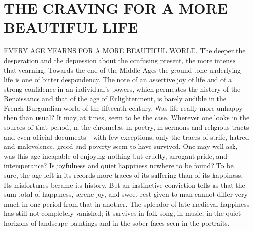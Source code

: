 \chapter{THE CRAVING FOR A MORE BEAUTIFUL LIFE}

EVERY AGE YEARNS FOR A MORE BEAUTIFUL WORLD. The deeper the desperation
and the depression about the confusing present, the more intense that
yearning. Towards the end of the Middle Ages the ground tone underlying
life is one of bitter despondency. The note of an assertive joy of life
and of a strong confidence in an individual's powers, which permeates
the history of the Renaissance and that of the age of Enlightenment, is
barely audible in the French-Burgundian world of the fifteenth century.
Was life really more unhappy then than usual? It may, at times, seem to
be the case. Wherever one looks in the sources of that period, in the
chronicles, in poetry, in sermons and religious tracts and even official
documents---with few exceptions, only the traces of strife, hatred and
malevolence, greed and poverty seem to have survived. One may well ask,
was this age incapable of enjoying nothing but cruelty, arrogant pride,
and intemperance? Is joyfulness and quiet happiness nowhere to be found?
To be sure, the age left in its records more traces of its suffering
than of its happiness. Its misfortunes became its history. But an
instinctive conviction tells us that the sum total of happiness, serene
joy, and sweet rest given to man cannot differ very much in one period
from that in another. The splendor of late medieval happiness has still
not completely vanished; it survives in folk song, in music, in the
quiet horizons of landscape paintings and in the sober faces seen in the
portraits.

